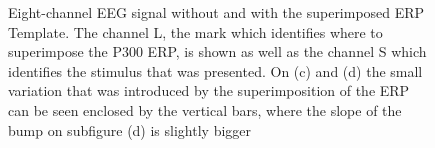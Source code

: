 \begin{figure}[htb]
\centering
{}
\caption[Pseudo-real Dataset EEG Streams]{Eight-channel EEG signal without and with the superimposed ERP Template. The channel L, the mark which identifies where to superimpose the P300 ERP, is shown as well as the channel S which identifies the stimulus that was presented. On (c) and (d) the small variation that was introduced by the superimposition of the ERP can be seen enclosed by the vertical bars, where the slope of the bump on subfigure (d) is slightly bigger}
\label{fig:gains}
\end{figure}

